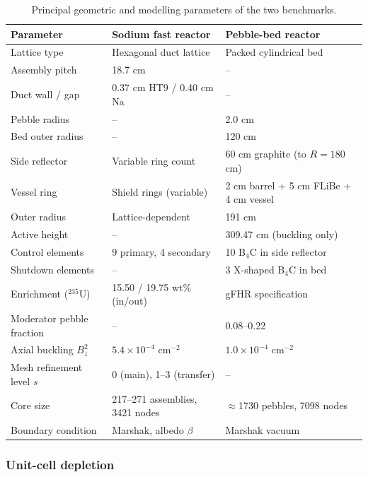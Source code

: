\documentclass[preprint,12pt]{elsarticle}
\newcommand{\Bz}{B_z^{2}}
\begin{document}
\begin{table}[htbp]
\centering
\caption{Principal geometric and modelling parameters of the two benchmarks.}
\label{tab:geometry}
\begin{tabular}{@{}lll@{}}
\toprule
Parameter & Sodium fast reactor & Pebble-bed reactor \\
\midrule
Lattice type              & Hexagonal duct lattice        & Packed cylindrical bed \\
Assembly pitch            & 18.7 cm                       & -- \\
Duct wall / gap           & 0.37 cm HT9 / 0.40 cm Na      & -- \\
Pebble radius             & --                            & 2.0 cm \\
Bed outer radius          & --                            & 120 cm \\
Side reflector            & Variable ring count           & 60 cm graphite (to $R=180$ cm) \\
Vessel ring               & Shield rings (variable)       & 2 cm barrel + 5 cm FLiBe + 4 cm vessel \\
Outer radius              & Lattice-dependent             & 191 cm \\
Active height             & --                            & 309.47 cm (buckling only) \\
Control elements          & 9 primary, 4 secondary        & 10 B$_4$C in side reflector \\
Shutdown elements         & --                            & 3 X-shaped B$_4$C in bed \\
Enrichment ($^{235}$U)    & 15.50 / 19.75 wt\% (in/out)   & gFHR specification \\
Moderator pebble fraction & --                            & 0.08--0.22 \\
Axial buckling $\Bz$      & $5.4\times10^{-4}$ cm$^{-2}$  & $1.0\times10^{-4}$ cm$^{-2}$ \\
Mesh refinement level $s$ & 0 (main), 1--3 (transfer)     & -- \\
Core size                 & 217--271 assemblies, 3421 nodes & $\approx$1730 pebbles, 7098 nodes \\
Boundary condition        & Marshak, albedo $\beta$       & Marshak vacuum \\
\bottomrule
\end{tabular}
\end{table}

\subsubsection{Unit-cell depletion}
\label{sec:depletion}
\end{document}
